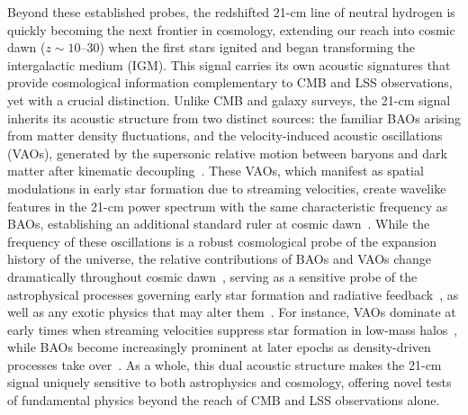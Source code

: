 Beyond these established probes, the redshifted 21-cm line of neutral hydrogen is quickly becoming the next frontier in cosmology, extending our reach into cosmic dawn ($z\sim10$--$30$) when the first stars ignited and began transforming the intergalactic medium (IGM). This signal carries its own acoustic signatures that provide cosmological information complementary to CMB and LSS observations, yet with a crucial distinction. Unlike CMB and galaxy surveys, the 21-cm signal inherits its acoustic structure from two distinct sources: the familiar BAOs arising from matter density fluctuations, and the velocity-induced acoustic oscillations (VAOs), generated by the supersonic relative motion between baryons and dark matter after kinematic decoupling~\citep{visbal12, mcquinn12, fialkov12, Fialkov:2013uwm, munoz19}. These VAOs, which manifest as spatial modulations in early star formation due to streaming velocities, create wavelike features in the 21-cm power spectrum with the same characteristic frequency as BAOs, establishing an additional standard ruler at cosmic dawn~\cite{munoz19b, Sarkar:2022mdz}. While the frequency of these oscillations is a robust cosmological probe of the expansion history of the universe, the relative contributions of BAOs and VAOs change dramatically throughout cosmic dawn~\citep{cruz25},  serving as a sensitive probe of the astrophysical processes governing early star formation and radiative feedback~\citep{munoz20,Libanore:2023oxf,Zhang:2024pwv, verwohlt2024}, as well as any exotic physics that may alter them~\citep{Hotinli:2021vxg,Hotinli:2021xln, cruz24}. For instance, VAOs dominate at early times when streaming velocities suppress star formation in low-mass halos~\citep{mcquinn12, schauer19, kulkarni21}, while BAOs become increasingly prominent at later epochs as density-driven processes take over~\citep{cruz25}. As a whole, this dual acoustic structure makes the 21-cm signal uniquely sensitive to both astrophysics and cosmology, offering novel tests of fundamental physics beyond the reach of CMB and LSS observations alone.


